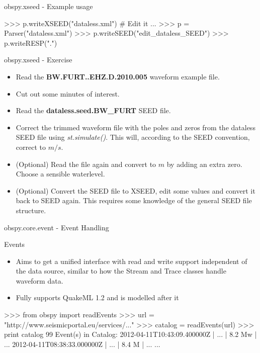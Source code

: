 \documentclass[handout]{beamer}
\begin{document}
\begin{frame}{obspy.xseed - Example usage}
\begin{myColorBox}{0.95}{}
\begin{python}
>>> p.writeXSEED("dataless.xml")
# Edit it ...
>>> p = Parser("dataless.xml")
>>> p.writeSEED("edit_dataless_SEED")
>>> p.writeRESP(".")
\end{python}
\end{myColorBox}
\end{frame}


\begin{frame}{obspy.xseed - Exercise}
    \begin{itemize}
        \item Read the \textbf{BW.FURT..EHZ.D.2010.005} waveform example file.
        \item Cut out some minutes of interest.
        \item Read the \textbf{dataless.seed.BW\_FURT} SEED file.
        \item Correct the trimmed waveform file with the poles and zeros from
            the dataless SEED file using \textit{st.simulate()}. This will,
            according to the SEED convention, correct to $m/s$.
        \item (Optional) Read the file again and convert to $m$ by adding an
            extra zero. Choose a sensible waterlevel.
        \item (Optional) Convert the SEED file to XSEED, edit some values and
            convert it back to SEED again. This requires some knowledge of the
            general SEED file structure.
    \end{itemize}
\end{frame}



\begin{frame}{}
    \begin{center}
        \textcolor{lmu@darkgreen}{\LARGE{obspy.core.event - Event Handling}}
    \end{center}
\end{frame}


\begin{frame}{Events}
    \begin{itemize}
        \item Aims to get a unified interface with read and write support independent of the data source, similar to how the Stream and Trace classes handle waveform data.
        \item Fully supports QuakeML 1.2 and is modelled after it
    \end{itemize}
\begin{myColorBox}{0.95}{}
\begin{python}
>>> from obspy import readEvents
>>> url = "http://www.seismicportal.eu/services/..."
>>> catalog = readEvents(url)
>>> print catalog
99 Event(s) in Catalog:
2012-04-11T10:43:09.400000Z |  ... | 8.2 Mw | ...
2012-04-11T08:38:33.000000Z |  ... | 8.4 M  | ...
...
\end{python}
\end{myColorBox}
\end{frame}
\end{document}
